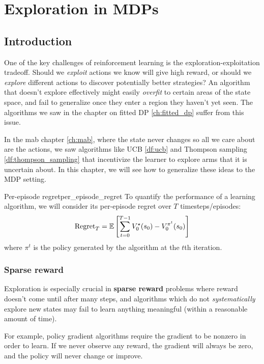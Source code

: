 \documentclass[\main/main]{subfiles}
\begin{document}
\tableofcontents

\chapter{Exploration in MDPs}



\section{Introduction}

One of the key challenges of reinforcement learning is the \gls{exploration-exploitation tradeoff}. Should we \emph{exploit} actions we know will give high reward, or should we \emph{explore} different actions to discover potentially better strategies?
An algorithm that doesn't explore effectively might easily \emph{overfit} to certain areas of the state space, and fail to generalize once they enter a region they haven't yet seen.
The algorithms we saw in the chapter on fitted DP \eqref{ch:fitted_dp} suffer from this issue.

In the \acrlong{mab} chapter \eqref{ch:mab}, where the state never changes so all we care about are the actions, we saw algorithms like UCB \ref{df:ucb} and Thompson sampling \ref{df:thompson_sampling} that incentivize the learner to explore arms that it is uncertain about.
In this chapter, we will see how to generalize these ideas to the MDP setting.

\begin{definition}{Per-episode regret}{per_episode_regret}
    To quantify the performance of a learning algorithm, we will consider its per-episode regret over $T$ timesteps/episodes:
    \[
        \text{Regret}_T = \operatorname*{\mathbb{E}}\left[ \sum_{t=0}^{T-1} V^\star_0(s_0) - V^{\pi^t}_0(s_0) \right]
    \]
    where $\pi^t$ is the policy generated by the algorithm at the $t$th iteration.
\end{definition}

\subsection{Sparse reward}

Exploration is especially crucial in \textbf{sparse reward} problems where reward doesn't come until after many steps,
and algorithms which do not \emph{systematically} explore new states may fail to learn anything meaningful (within a reasonable amount of time).

For example, policy gradient algorithms require the gradient to be nonzero in order to learn. If we never observe any reward, the gradient will always be zero, and the policy will never change or improve.
\end{document}
